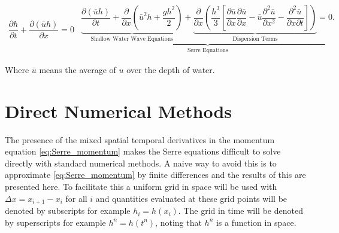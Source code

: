 \documentclass[SingleSpace,12pt,Proceedings]{Serre_ASCE}
\begin{document}
\begin{linenomath*}
\begin{subequations}\label{eq:Serre_nonconservative_form}
\begin{gather}
\dfrac{\partial h}{\partial t} + \dfrac{\partial (\bar{u}h)}{\partial x} = 0
\label{eq:Serre_continuity}
\end{gather}
\begin{gather}
\underbrace{\underbrace{\dfrac{\partial (\bar{u}h)}{\partial t} + \dfrac{\partial}{\partial x} \left ( \bar{u}^2h + \dfrac{gh^2}{2}\right )}_{\text{Shallow Water Wave Equations}} + \underbrace{\dfrac{\partial}{\partial x} \left (  \dfrac{h^3}{3} \left [ \dfrac{\partial \bar{u} }{\partial x} \dfrac{\partial \bar{u}}{\partial x} - \bar{u} \dfrac{\partial^2 \bar{u}}{\partial x^2}  - \dfrac{\partial^2 \bar{u}}{\partial x \partial t}\right ] \right )}_{\text{Dispersion Terms}} = 0.}_{\text{Serre Equations}}
\label{eq:Serre_momentum}
\end{gather}
\end{subequations}
\end{linenomath*}
Where $\bar{u}$ means the average of $u$ over the depth of water. 
\section{Direct Numerical Methods} 
\label{sec:DirNumMet}
The presence of the mixed spatial temporal derivatives in the momentum equation \eqref{eq:Serre_momentum} makes the Serre equations difficult to solve directly with standard numerical methods. A naive way to avoid this is to approximate \eqref{eq:Serre_momentum} by finite differences and the results of this are presented here. To facilitate this a uniform grid in space will be used with $\Delta x  = x_{i+1} - x_i$ for all $i$ and quantities evaluated at these grid points will be denoted by subscripts for example $h_i = h(x_i)$. The grid in time will be denoted by superscripts for example $h^n = h(t^n)$, noting that $h^n$ is a function in space. 
\end{document}
